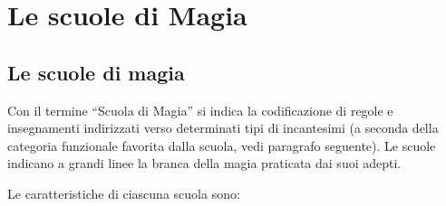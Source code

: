 \chapter{Le scuole di Magia}

\newcommand{\Simbolo}[1] {\begin{center}\texttt{[image: \#1]}\end{center}}

\section{Le scuole di magia}
\label{scuole}

Con il termine ``Scuola di Magia'' si indica
la codificazione di regole e insegnamenti indirizzati verso
determinati tipi di incantesimi (a seconda della categoria funzionale
favorita dalla scuola, vedi paragrafo seguente). Le scuole indicano a
grandi linee la branca della magia praticata dai suoi adepti.

Le caratteristiche di ciascuna
scuola sono:

